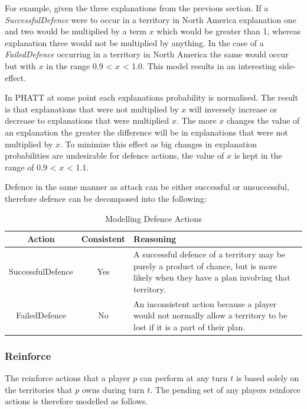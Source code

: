 \documentclass[parskip]{cs4rep}
\begin{document}
For example, given the three explanations from the previous section. If a \textit{SuccessfulDefence} were to occur in a territory in North America explanation one and two would be multiplied by a term $x$ which would be greater than 1, whereas explanation three would not be multiplied by anything. In the case of a \textit{FailedDefence} occurring in a territory in North America the same would occur but with $x$ in the range 0.9 < $x$ < 1.0. This model results in an interesting side-effect.

In PHATT at some point each explanations probability is normalised. The result is that explanations that were not multiplied by $x$ will inversely increase or decrease to explanations that were multiplied $x$. The more $x$ changes the value of an explanation the greater the difference will be in explanations that were not multiplied by $x$. To minimize this effect as big changes in explanation probabilities are undesirable for defence actions, the value of $x$ is kept in the range of 0.9 < $x$ < 1.1.

Defence in the same manner as attack can be either successful or unsuccessful, therefore defence can be decomposed into the following: 

\begin{table}[ht]
\centering
\begin{tabular}{|c|c|p{8cm}|}
\hline 
\textbf{Action} & \textbf{Consistent}  & \textbf{Reasoning} \\ 
\hline 
SuccessfulDefence & Yes & A successful defence of a territory may be purely a product of chance, but is more likely when they have a plan involving that territory. \\ 
\hline 
FailedDefence & No & An inconsistent action because a player would not normally allow a territory to be lost if it is a part of their plan. \\ 
\hline
\end{tabular}
\caption{Modelling Defence Actions}
\label{table:attack-defend-modelling}
\end{table}

\newpage

\subsubsection{Reinforce}

The reinforce actions that a player $p$ can perform at any turn $t$ is based solely on the territories that $p$ owns during turn $t$. The pending set of any players reinforce actions is therefore modelled as follows. 
\end{document}
